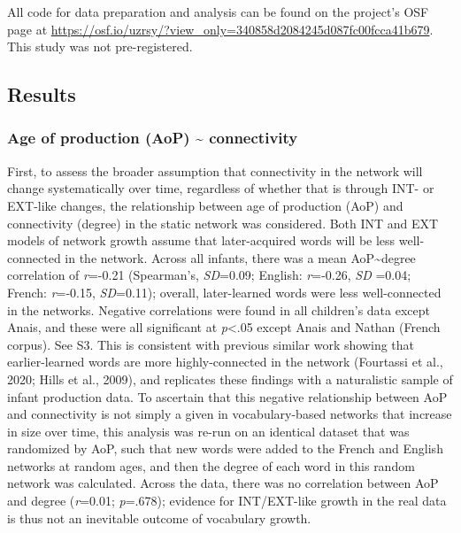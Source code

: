 \documentclass[
  man]{apa6}
\begin{document}
All code for data preparation and analysis can be found on the project's OSF page at \url{https://osf.io/uzrsy/?view_only=340858d2084245d087fc00fcca41b679}. This study was not pre-registered.

\hypertarget{results}{%
\subsection{Results}\label{results}}

\hypertarget{age-of-production-aop-connectivity}{%
\subsubsection{Age of production (AoP) \textasciitilde{} connectivity}\label{age-of-production-aop-connectivity}}

First, to assess the broader assumption that connectivity in the network will change systematically over time, regardless of whether that is through INT- or EXT-like changes, the relationship between age of production (AoP) and connectivity (degree) in the static network was considered. Both INT and EXT models of network growth assume that later-acquired words will be less well-connected in the network. Across all infants, there was a mean AoP\textasciitilde degree correlation of \emph{r}=-0.21 (Spearman's, \emph{SD}=0.09; English: \emph{r}=-0.26, \emph{SD} =0.04; French: \emph{r}=-0.15, \emph{SD}=0.11); overall, later-learned words were less well-connected in the networks. Negative correlations were found in all children's data except Anais, and these were all significant at \emph{p}\textless.05 except Anais and Nathan (French corpus). See S3. This is consistent with previous similar work showing that earlier-learned words are more highly-connected in the network (Fourtassi et al., 2020; Hills et al., 2009), and replicates these findings with a naturalistic sample of infant production data. To ascertain that this negative relationship between AoP and connectivity is not simply a given in vocabulary-based networks that increase in size over time, this analysis was re-run on an identical dataset that was randomized by AoP, such that new words were added to the French and English networks at random ages, and then the degree of each word in this random network was calculated. Across the data, there was no correlation between AoP and degree (\emph{r}=0.01; \emph{p}=.678); evidence for INT/EXT-like growth in the real data is thus not an inevitable outcome of vocabulary growth.
\end{document}
